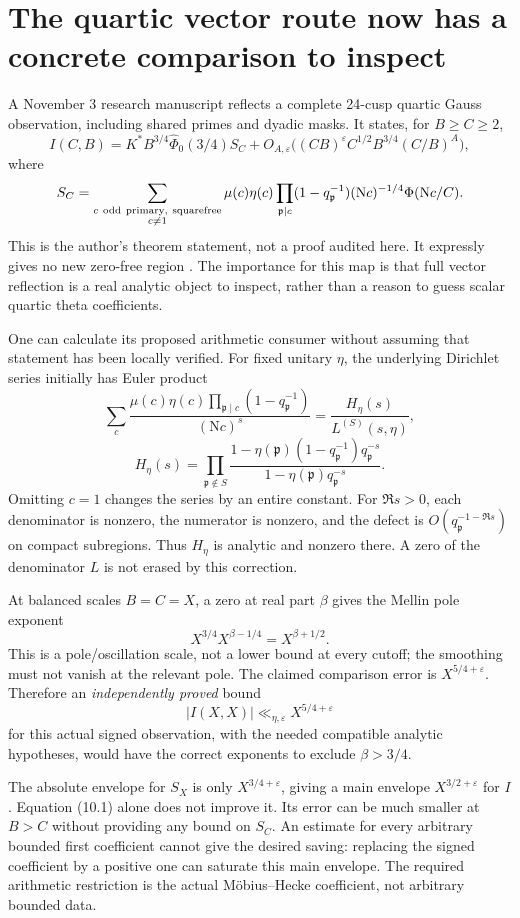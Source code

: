 \documentclass[11pt]{article}
\newcommand{\N}{\mathrm N}
\newcommand{\eps}{\varepsilon}
\begin{document}
\section{The quartic vector route now has a concrete comparison to inspect}

A November 3 research manuscript reflects a complete 24-cusp quartic
Gauss observation, including shared primes and dyadic masks.
It states, for $B\ge C\ge2$,
\[
 I(C,B)=K^*B^{3/4}\widehat\Phi_0(3/4)S_C+
 O_{A,\eps}\big((CB)^\eps C^{1/2}B^{3/4}(C/B)^A\big),
 \tag{10.1}
\]
where
\[
 S_C=\sum_{\substack{c\ {\rm odd\ primary,\ squarefree}\\c\ne1}}
 \mu(c)\eta(c)\prod_{\mathfrak p\mid c}(1-q_{\mathfrak p}^{-1})
 (\N c)^{-1/4}\Phi(\N c/C).
\]
This is the author's theorem statement, not a proof audited here.
It expressly gives no new zero-free region \cite{QuarticObservation}.
The importance for this map is that full vector reflection is a real
analytic object to inspect, rather than a reason to guess scalar
quartic theta coefficients.

One can calculate its proposed arithmetic consumer without assuming
that statement has been locally verified. For fixed unitary $\eta$,
the underlying Dirichlet series initially has Euler product
\[
 \sum_c\frac{\mu(c)\eta(c)\prod_{\mathfrak p\mid c}
 (1-q_{\mathfrak p}^{-1})}{(\N c)^s}
 =\frac{H_\eta(s)}{L^{(S)}(s,\eta)},
\]
\[
 H_\eta(s)=\prod_{\mathfrak p\notin S}
 \frac{1-\eta(\mathfrak p)(1-q_{\mathfrak p}^{-1})q_{\mathfrak p}^{-s}}
      {1-\eta(\mathfrak p)q_{\mathfrak p}^{-s}} .
 \tag{10.2}
\]
Omitting $c=1$ changes the series by an entire constant. For
$\Re s>0$, each denominator is nonzero, the numerator is nonzero,
and the defect is $O(q_{\mathfrak p}^{-1-\Re s})$ on compact subregions.
Thus $H_\eta$ is analytic and nonzero there. A zero of the denominator
$L$ is not erased by this correction.

At balanced scales $B=C=X$, a zero at real part $\beta$ gives the
Mellin pole exponent
\[
 X^{3/4}X^{\beta-1/4}=X^{\beta+1/2}.
\]
This is a pole/oscillation scale, not a lower bound at every cutoff;
the smoothing must not vanish at the relevant pole.
The claimed comparison error is $X^{5/4+\eps}$.
Therefore an \emph{independently proved} bound
\[
 |I(X,X)|\ll_{\eta,\eps}X^{5/4+\eps}
 \tag{10.3}
\]
for this actual signed observation, with the needed compatible analytic
hypotheses, would have the correct exponents to exclude $\beta>3/4$.

The absolute envelope for $S_X$ is only $X^{3/4+\eps}$, giving a
main envelope $X^{3/2+\eps}$ for $I$.
Equation (10.1) alone does not improve it. Its error can be much smaller
at $B>C$ without providing any bound on $S_C$.
An estimate for every arbitrary bounded first coefficient cannot give
the desired saving: replacing the signed coefficient by a positive one
can saturate this main envelope. The required arithmetic restriction
is the actual Möbius--Hecke coefficient, not arbitrary bounded data.
\end{document}
